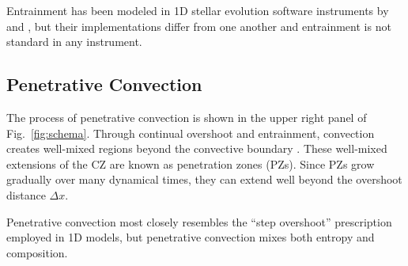 Entrainment has been modeled in 1D stellar evolution software instruments by \citet{staritsin_2013} and \citet{scott_etal_2021}, but their implementations differ from one another and entrainment is not standard in any instrument.


\subsection{Penetrative Convection}
The process of penetrative convection is shown in the upper right panel of Fig.~\ref{fig:schema}.
Through continual overshoot and entrainment, convection creates well-mixed regions beyond the convective boundary \citep{anders_etal_2022}.
These well-mixed extensions of the CZ are known as penetration zones (PZs).
Since PZs grow gradually over many dynamical times, they can extend well beyond the overshoot distance $\Delta x$.

Penetrative convection most closely resembles the ``step overshoot'' prescription employed in 1D models, but penetrative convection mixes both entropy and composition.
